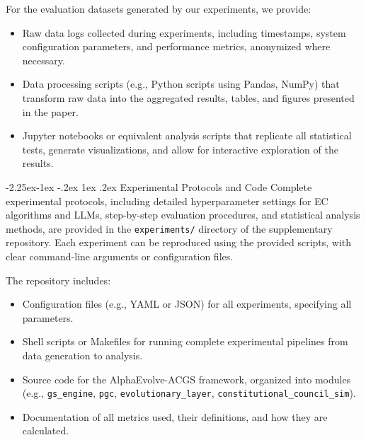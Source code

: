 \documentclass[manuscript,screen,review,anonymous,9pt]{acmart}
\makeatletter
\renewcommand\subsection{\@startsection{subsection}{2}{\z@}%
  {-2.25ex\@plus -1ex \@minus -.2ex}%
  {1ex \@plus .2ex}%
  {\normalfont\large\bfseries}}
\makeatother
\begin{document}
For the evaluation datasets generated by our experiments, we provide:
\begin{itemize}[leftmargin=*,itemsep=1pt,parsep=1pt]
    \item Raw data logs collected during experiments, including timestamps, system configuration parameters, and performance metrics, anonymized where necessary.
    \item Data processing scripts (e.g., Python scripts using Pandas, NumPy) that transform raw data into the aggregated results, tables, and figures presented in the paper.
    \item Jupyter notebooks or equivalent analysis scripts that replicate all statistical tests, generate visualizations, and allow for interactive exploration of the results.
\end{itemize}

\subsection{Experimental Protocols and Code}
Complete experimental protocols, including detailed hyperparameter settings for EC algorithms and LLMs, step-by-step evaluation procedures, and statistical analysis methods, are provided in the \texttt{experiments/} directory of the supplementary repository. Each experiment can be reproduced using the provided scripts, with clear command-line arguments or configuration files.

The repository includes:
\begin{itemize}[leftmargin=*,itemsep=1pt,parsep=1pt]
    \item Configuration files (e.g., YAML or JSON) for all experiments, specifying all parameters.
    \item Shell scripts or Makefiles for running complete experimental pipelines from data generation to analysis.
    \item Source code for the AlphaEvolve-ACGS framework, organized into modules (e.g., \texttt{gs\_engine}, \texttt{pgc}, \texttt{evolutionary\_layer}, \texttt{constitutional\_council\_sim}).
    \item Documentation of all metrics used, their definitions, and how they are calculated.
\end{itemize}
\end{document}
